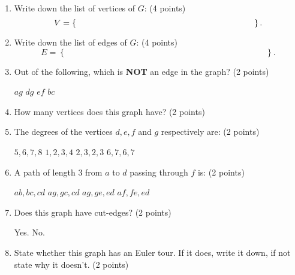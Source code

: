 \documentclass[12pt]{exam}
\begin{document}
\begin{enumerate}
\begin{figure}[h!]
\begin{tikzpicture}[x=0.75pt,y=0.75pt,yscale=-1,xscale=1]
    
    \end{tikzpicture}
    

    
\end{figure}

\begin{enumerate}
    \item \label{firstQnSec1} Write down the list of vertices of $G$: (4 points)
    \vspace{0.5em}
    $$V=\left\lbrace\hspace{7.5cm}\right\rbrace.$$
    \vfill
    \item Write down the list of edges of $G$: (4 points)
    \vspace{0.5em}
    $$E=\left\lbrace\hspace{10cm}\right\rbrace.$$
    \vfill
    \item Out of the following, which is \textbf{NOT} an edge in the graph? (2 points)
    \begin{checkboxes}
        \choice $ag$
        \choice $dg$
        \choice $ef$
        \choice $bc$
    \end{checkboxes}
    \vfill
    \item How many vertices does this graph have? (2 points)
    \begin{checkboxes}
    \end{checkboxes}
    \vfill
    \newpage
    \item The degrees of the vertices $d,e,f$ and $g$ respectively are: (2 points)
    \begin{checkboxes}
        \choice $5,6,7,8$
        \choice $1,2,3,4$
        \choice $2,3,2,3$
        \choice $6,7,6,7$
    \end{checkboxes}
    \vfill
    \item A path of length $3$ from $a$ to $d$ passing through $f$ is: (2 points)
    \begin{checkboxes}
        \choice $ab,bc,cd$
        \choice $ag,gc,cd$
        \choice $ag,ge,ed$
        \choice $af,fe,ed$
    \end{checkboxes}
    \vfill
    \item Does this graph have cut-edges? (2 points)
    \begin{checkboxes}
        \choice Yes.
        \choice No.
    \end{checkboxes}
    \vfill
    \item State whether this graph has an Euler tour. If it does, write it down, if not state why it doesn't. (2 points)

\end{enumerate}
\end{enumerate}
\end{document}
